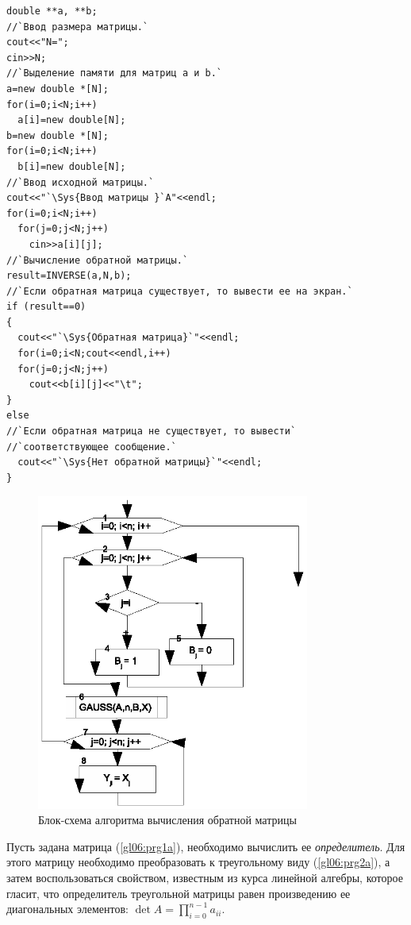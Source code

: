 \begin{lstlisting}
double **a, **b; 
//`Ввод размера матрицы.`
cout<<"N=";
cin>>N;
//`Выделение памяти для матриц a и b.`
a=new double *[N];
for(i=0;i<N;i++)
  a[i]=new double[N];
b=new double *[N];
for(i=0;i<N;i++)
  b[i]=new double[N];
//`Ввод исходной матрицы.`
cout<<"`\Sys{Ввод матрицы }`A"<<endl;
for(i=0;i<N;i++)
  for(j=0;j<N;j++)
    cin>>a[i][j];
//`Вычисление обратной матрицы.`
result=INVERSE(a,N,b);
//`Если обратная матрица существует, то вывести ее на экран.`
if (result==0)
{
  cout<<"`\Sys{Обратная матрица}`"<<endl;
  for(i=0;i<N;cout<<endl,i++)
  for(j=0;j<N;j++)
    cout<<b[i][j]<<"\t";
}
else
//`Если обратная матрица не существует, то вывести`
//`соответствующее сообщение.`
  cout<<"`\Sys{Нет обратной матрицы}`"<<endl;
}
\end{lstlisting}

\begin{figure}[htb]
\begin{center}
\includegraphics[width=0.8\textwidth]{img/ris_6_16}
\caption{Блок-схема алгоритма вычисления обратной матрицы}
\label{ch06:refDrawing15}
\end{center}
\end{figure}


Пусть задана матрица (\ref{gl06:prg1a}), необходимо вычислить ее \emph{определитель}. Для этого матрицу необходимо преобразовать к треугольному виду (\ref{gl06:prg2a}), а затем воспользоваться
свойством, известным из курса линейной алгебры, которое гласит, что определитель треугольной матрицы равен произведению
ее диагональных элементов: $\det A=\prod\limits_{i=0}^{n-1}a_{ii}$.

